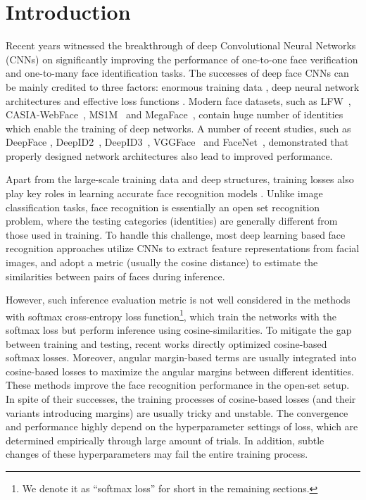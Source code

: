 \documentclass[10pt,twocolumn,letterpaper]{article}
\begin{document}
\section{Introduction}
Recent years witnessed the breakthrough of deep Convolutional Neural Networks (CNNs) \cite{krizhevsky2012imagenet,hu2017squeeze,parkhi2015deep,szegedy2015going} on significantly improving the performance of  one-to-one  face verification and one-to-many  face identification tasks. The successes of deep face CNNs can be mainly credited to three factors: enormous training data \cite{MS-Celeb-1M}, deep neural network architectures \cite{he2016deep,IR} and effective loss functions \cite{L2-softmax,liu_2017_coco_v2,ArcFace}. Modern face datasets, such as LFW~\cite{LFW}, CASIA-WebFace~\cite{WebFace}, MS1M~\cite{MS-Celeb-1M} and MegaFace~\cite{MegaFace1,MegaFace2}, contain huge number of identities which enable the training of deep networks. A number of recent studies, such as DeepFace \cite{DeepFace}, DeepID2~\cite{DeepID2}, DeepID3~\cite{DeepID3}, VGGFace~\cite{parkhi2015deep} and FaceNet~\cite{FaceNet}, demonstrated that properly designed network architectures also lead to improved performance.

Apart from the large-scale training data and deep structures, training losses also play key roles in learning accurate face recognition models \cite{tripletloss2,contrastiveloss,hoffer2015deep}. Unlike image classification tasks, face recognition is essentially an open set recognition problem, where the testing categories (identities) are generally different from those used in training. To handle this challenge, most deep learning based face recognition approaches \cite{DeepID2,DeepID3,DeepFace} utilize CNNs to extract feature representations from facial images, and adopt a metric (usually the cosine distance) to estimate the similarities between pairs of faces during inference.

However, such inference evaluation metric is not well considered in the methods with softmax cross-entropy loss function\footnote{We denote it as ``softmax loss'' for short in the remaining sections.}, which train the networks with the softmax loss but perform inference using cosine-similarities. To mitigate the gap between training and testing, recent works \cite{liu_2017_coco_v2, L2-softmax, NormFace,gopal2014mises} directly optimized cosine-based softmax losses.
Moreover, angular margin-based terms \cite{L-softmax,A-softmax,CosFace,AM-softmax,ArcFace} are usually integrated into cosine-based losses to maximize the angular margins between different identities. 
These methods improve the face recognition performance in the open-set setup. In spite of their successes, the training processes of cosine-based losses (and their variants introducing margins) are usually tricky and unstable. The convergence and performance highly depend on the hyperparameter settings of loss, which are determined empirically through large amount of trials. In addition, subtle changes of these hyperparameters may fail the entire training process.
\end{document}
